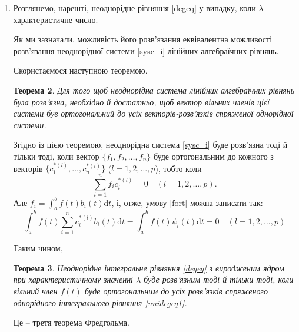 \documentclass[14pt,twoside]{extreport}
\theoremstyle{mystyle}
\newtheorem{thm}{Теорема}
\numberwithin{equation}{chapter}
\begin{document}
\begin{enumerate}
Отже,

\begin{thm}
Якщо $\lambda$ є характеристичним число ядра $K(t, s)$, то однорідне інтегральне рівняння \eqref{unideg} і спряжене з ним рівняння \eqref{unidegeq1} мають ту саму скінченну кількість лінійно незалежних власних функцій.
\end{thm}
Це -- друга теорема Фредгольма.

\item Розглянемо, нарешті, неоднорідне рівняння \eqref{degeq} у випадку, коли $\lambda$ -- характеристичне число.

Як ми зазначали, можливість його розв'язання еквівалентна можливості розв'язання неоднорідної системи \eqref{sysc_i} лінійних алгебраїчних рівнянь.

Скористаємося наступною теоремою.

\begin{thm} Для того щоб неоднорідна система лінійних алгебраїчних рівнянь була розв'язна, необхідно й достатньо, щоб вектор вільних членів цієї системи був ортогональний до усіх векторів-розв'язків спряженої однорідної системи.
\end{thm}

Згідно із цією теоремою, неоднорідна система \eqref{sysc_i} буде розв'язна тоді й тільки тоді, коли вектор $\{f_1, f_2, \ldots, f_n\}$ буде ортогональним до кожного з векторів $\{c_1^{*(l)}, \ldots, c_n^{*(l)}\}$ ($l=1, 2, \ldots, p$), тобто коли
\begin{equation}\label{fort}
 \sum_{i=1}^{n}f_{i}c_{i}^{*(l)}=0 \quad (l=1, 2, \ldots, p).
\end{equation}
Але $f_{i}=\int_{a}^{b}f(t)b_{i}(t)\mathrm{d}t$, і, отже, умову \eqref{fort} можна записати так:
\begin{equation}\label{threecond}
 \int_{a}^{b}f(t)\sum_{i=1}^{n}c_{i}^{*(l)}b_{i}(t)\mathrm{d}t=\int_{a}^{b} f(t)\psi_{l}(t)\mathrm{d}t=0 \quad (l=1, 2, \ldots, p)
\end{equation}

Таким чином,
\begin{thm}
 Неоднорідне інтегральне рівняння \eqref{degeq} з виродженим ядром при характеристичному значенні $\lambda$ буде розв'язним тоді й тільки тоді, коли вільний член $f(t)$ буде ортогональним до усіх розв'язків спряженого однорідного інтегрального рівняння \eqref{unidegeq1}.
\end{thm}
Це -- третя теорема Фредгольма.


\end{enumerate}
\end{document}
